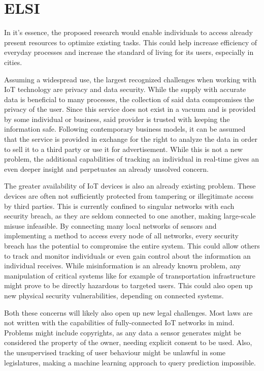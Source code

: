 \documentclass [journal]{IEEEtran}
\begin{document}
 \section{ELSI}
In it's essence, the proposed research would enable individuals to access already present resources to optimize existing tasks. This could help increase efficiency of everyday processes and increase the standard of living for its users, especially in cities. \par
Assuming a widespread use, the largest recognized challenges when working with IoT technology are privacy and data security. While the supply with accurate data is beneficial to many processes, the collection of said data compromises the privacy of the user. Since this service does not exist in a vacuum and is provided by some individual or business, said provider is trusted with keeping the information safe. Following contemporary business models, it can be assumed that the service is provided in exchange for the right to analyze the data in order to sell it to a third party or use it for advertisement. While this is not a new problem, the additional capabilities of tracking an individual in real-time gives an even deeper insight and perpetuates an already unsolved concern. \par
The greater availability of IoT devices is also an already existing problem. These devices are often not sufficiently protected from tampering or illegitimate access by third parties. This is currently confined to singular networks with each security breach, as they are seldom connected to one another, making large-scale misuse infeasible. By connecting many local networks of sensors and implementing a method to access every node of all networks, every security breach has the potential to compromise the entire system. This could allow others to track and monitor individuals or even gain control about the information an individual receives. While misinformation is an already known problem, any manipulation of critical systems like for example of transportation infrastructure might prove to be directly hazardous to targeted users. This could also open up new physical security vulnerabilities, depending on connected systems. \par
Both these concerns will likely also open up new legal challenges. Most laws are not written with the capabilities of fully-connected IoT networks in mind. Problems might include copyrights, as any data a sensor generates might be considered the property of the owner, needing explicit consent to be used. Also, the unsupervised tracking of user behaviour might be unlawful in some legislatures, making a machine learning approach to query prediction impossible. \par
\end{document}
